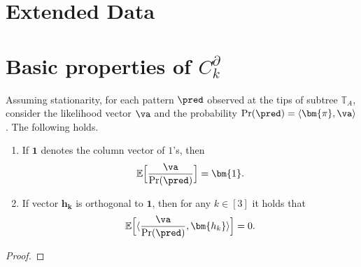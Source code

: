 \begin{appendices}
\renewcommand\thefigure{S\arabic{figure}} %
{} 

\renewcommand\thetable{S\arabic{table}} %
{} 


\renewcommand*\contentsname{}
\section*{Extended Data}
\tableofcontents

\clearpage

\section{Basic properties of \texorpdfstring{$C^\partial_k$}{C}
}
\label{sec:apx}

\begin{prop}\label{prop:totalSumLikelihood} Assuming stationarity, for each pattern $\pred$ observed at the tips of subtree $\mathbb{T}_A$, consider the likelihood vector $\va$ and  the probability ${\Pr(\pred) = \langle \bm{\pi},  \va \rangle }$. The following holds.

\smallskip


\begin{enumerate}[label=\alph*)]
\item If $\bm{1}$ denotes the column vector of $1$'s, then
\begin{equation*} \label{eq:expected1}
\mathbb{E}\Big[\frac{\va}{\Pr(\pred)}\Big] = \bm{1}.
 \end{equation*}
\item If vector $\bm{h_k}$ is orthogonal to $\bm{1}$, then for any $k \in [3]$ it holds that
 \begin{equation*}\label{eq:expectedscalar0}
 \mathbb{E}\Big[\langle \frac{\va}{\Pr(\pred)}, \bm{h_k}\rangle\Big] = 0.
 \end{equation*}
 \end{enumerate}
\end{prop}
\begin{proof} \hfill



\end{proof}
\end{appendices}
